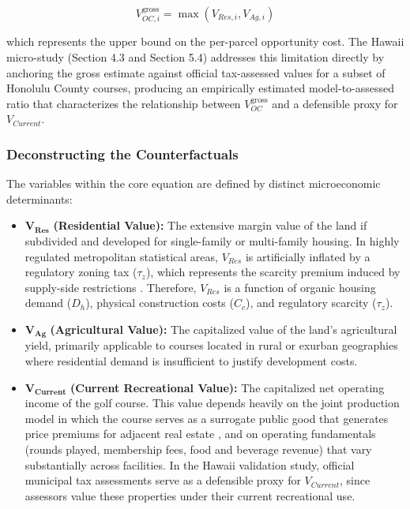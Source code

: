 \documentclass[11pt, letterpaper]{article}
\begin{document}
\begin{equation}
    V_{OC, i}^{\text{gross}} = \max(V_{Res, i}, V_{Ag, i})
\end{equation}

\noindent which represents the upper bound on the per-parcel opportunity cost. The Hawaii micro-study (Section 4.3 and Section 5.4) addresses this limitation directly by anchoring the gross estimate against official tax-assessed values for a subset of Honolulu County courses, producing an empirically estimated model-to-assessed ratio that characterizes the relationship between $V_{OC}^{\text{gross}}$ and a defensible proxy for $V_{Current}$.

\subsubsection{Deconstructing the Counterfactuals}

The variables within the core equation are defined by distinct microeconomic determinants:

\begin{itemize}[leftmargin=*]
    \item $\mathbf{V_{Res}}$ \textbf{(Residential Value):} The extensive margin value of the land if subdivided and developed for single-family or multi-family housing. In highly regulated metropolitan statistical areas, $V_{Res}$ is artificially inflated by a regulatory zoning tax ($\tau_z$), which represents the scarcity premium induced by supply-side restrictions \parencite{Glaeser2005, Gyourko2021}. Therefore, $V_{Res}$ is a function of organic housing demand ($D_h$), physical construction costs ($C_c$), and regulatory scarcity ($\tau_z$).
    \item $\mathbf{V_{Ag}}$ \textbf{(Agricultural Value):} The capitalized value of the land's agricultural yield, primarily applicable to courses located in rural or exurban geographies where residential demand is insufficient to justify development costs.
    \item $\mathbf{V_{Current}}$ \textbf{(Current Recreational Value):} The capitalized net operating income of the golf course. This value depends heavily on the joint production model in which the course serves as a surrogate public good that generates price premiums for adjacent real estate \parencite{Limehouse2012}, and on operating fundamentals (rounds played, membership fees, food and beverage revenue) that vary substantially across facilities. In the Hawaii validation study, official municipal tax assessments serve as a defensible proxy for $V_{Current}$, since assessors value these properties under their current recreational use.
\end{itemize}
\end{document}
